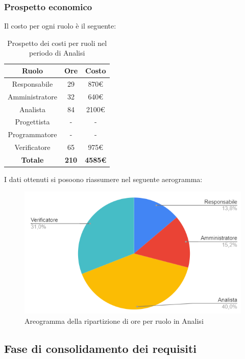 \subsubsection{Prospetto economico}
Il costo per ogni ruolo è il seguente:
\begin{table}[H]
		\begin{center}
			\setlength{\aboverulesep}{0pt}
			\setlength{\belowrulesep}{0pt}
			\setlength{\extrarowheight}{.75ex}
			\begin{tabular}{ c c c }
				\rowcolor{AzzurroGruppo!30} 
				\textbf{Ruolo} & \textbf{Ore} & \textbf{Costo}  \\
				\toprule
				Responsabile & 29 & 870€ \\
				Amministratore & 32 & 640€ \\
				Analista & 84 & 2100€ \\
				Progettista & - & - \\
				Programmatore & - & - \\
				Verificatore & 65 & 975€ \\
				\textbf{Totale} & \textbf{210} & \textbf{4585€} \\
				\bottomrule
			\end{tabular}
			\caption{ Prospetto dei costi per ruoli nel periodo di Analisi}
		\end{center}
\end{table}
I dati ottenuti si posoono riassumere nel seguente aerogramma:
\begin{figure}[H]
    \centering
    \includegraphics[scale = 0.5]{components/img/analisi_torta.png}
    \caption{ Areogramma della ripartizione di ore per ruolo in Analisi}
    \label{fig:logo}
\end{figure}
\subsection{Fase di consolidamento dei requisiti}
